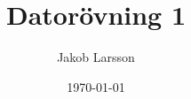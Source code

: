 \documentclass[a4paper,12pt]{article}
\begin{document}
    \title{Datorövning 1}
    \author{Jakob Larsson}
    \date{\today}
\end{document}
